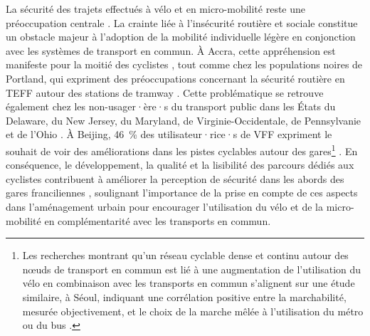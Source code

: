 \begin{refsegment}
La sécurité des trajets effectués à vélo et en micro-mobilité reste une préoccupation centrale \textcolor{blue}{\autocite[3]{yang_empirical_2016}}. La crainte liée à l'insécurité routière et sociale constitue un obstacle majeur à l'adoption de la mobilité individuelle légère en conjonction avec les systèmes de transport en commun. À Accra, cette appréhension est manifeste pour la moitié des cyclistes \textcolor{blue}{\autocite[112]{quarshie_integrating_2007}}, tout comme chez les populations noires de Portland, qui expriment des préoccupations concernant la sécurité routière en \acrshort{TEFF} autour des stations de tramway \textcolor{blue}{\autocite[414]{mcqueen_assessing_2022}}. Cette problématique se retrouve également chez les non-usager·ère·s du transport public dans les États du Delaware, du New Jersey, du Maryland, de Virginie-Occidentale, de Pennsylvanie et de l'Ohio \textcolor{blue}{\autocite[4962]{bopp_examining_2015}}. À Beijing, 46~\% des utilisateur·rice·s de \acrshort{VFF} expriment le souhait de voir des améliorations dans les pistes cyclables autour des gares\footnote{
    Les recherches montrant qu'un réseau cyclable dense et continu autour des nœuds de transport en commun est lié à une augmentation de l'utilisation du vélo en combinaison avec les transports en commun s'alignent sur une étude similaire, à Séoul, indiquant une corrélation positive entre la \gls{marchabilité}, mesurée objectivement, et le choix de la marche mêlée à l'utilisation du métro ou du bus \textcolor{blue}{\autocite[9]{kim_does_2020}}.
} \textcolor{blue}{\autocite[13]{fan_how_2019}}. En conséquence, le développement, la qualité et la lisibilité des parcours dédiés aux cyclistes contribuent à améliorer la perception de sécurité dans les abords des gares franciliennes \textcolor{blue}{\autocite[85]{stransky_quartiers_2017}}, soulignant l'importance de la prise en compte de ces aspects dans l'aménagement urbain pour encourager l'utilisation du vélo et de la micro-mobilité en complémentarité avec les transports en commun.%


\end{refsegment}
